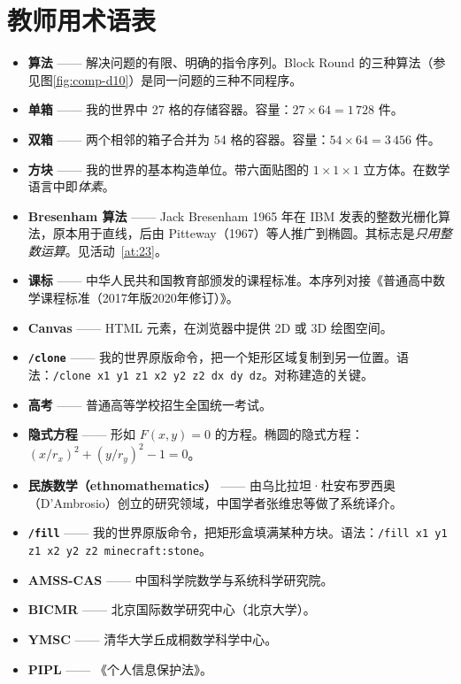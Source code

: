 \documentclass[12pt,a4paper]{scrartcl}
\newcommand{\code}[1]{\texttt{\small #1}}
\newcommand{\acc}[1]{\textcolor{accent}{\textbf{#1}}}
\newcommand{\cmd}[1]{\textcolor{earth}{\texttt{\small #1}}}
\begin{document}
\newpage
\section{教师用术语表}\label{ap:glos}

\begin{itemize}[leftmargin=1.4em,itemsep=0.3em,topsep=0.3em]
  \item \acc{算法} —— 解决问题的有限、明确的指令序列。Block Round 的三种算法（参见图\ref{fig:comp-d10}）是同一问题的三种不同程序。
  \item \acc{单箱} —— 我的世界中 27 格的存储容器。容量：$27 \times 64 = 1\,728$ 件。
  \item \acc{双箱} —— 两个相邻的箱子合并为 54 格的容器。容量：$54 \times 64 = 3\,456$ 件。
  \item \acc{方块} —— 我的世界的基本构造单位。带六面贴图的 $1 \times 1 \times 1$ 立方体。在数学语言中即\emph{体素}。
  \item \acc{Bresenham 算法} —— Jack Bresenham 1965 年在 IBM 发表的整数光栅化算法，原本用于直线，后由 Pitteway（1967）等人推广到椭圆。其标志是\emph{只用整数运算}。见活动~\ref{at:23}。
  \item \acc{课标} —— 中华人民共和国教育部颁发的课程标准。本序列对接《普通高中数学课程标准（2017年版2020年修订）》。
  \item \acc{Canvas} —— HTML 元素，在浏览器中提供 2D 或 3D 绘图空间。
  \item \acc{\code{/clone}} —— 我的世界原版命令，把一个矩形区域复制到另一位置。语法：\cmd{/clone x1 y1 z1 x2 y2 z2 dx dy dz}。对称建造的关键。
  \item \acc{高考} —— 普通高等学校招生全国统一考试。
  \item \acc{隐式方程} —— 形如 $F(x, y) = 0$ 的方程。椭圆的隐式方程：$(x/r_x)^2 + (y/r_y)^2 - 1 = 0$。
  \item \acc{民族数学（ethnomathematics）} —— 由乌比拉坦·杜安布罗西奥（D'Ambrosio）创立的研究领域，中国学者张维忠等做了系统译介。
  \item \acc{\code{/fill}} —— 我的世界原版命令，把矩形盒填满某种方块。语法：\cmd{/fill x1 y1 z1 x2 y2 z2 minecraft:stone}。
  \item \acc{AMSS-CAS} —— 中国科学院数学与系统科学研究院。
  \item \acc{BICMR} —— 北京国际数学研究中心（北京大学）。
  \item \acc{YMSC} —— 清华大学丘成桐数学科学中心。
  \item \acc{PIPL} —— 《个人信息保护法》。

\end{itemize}
\end{document}
